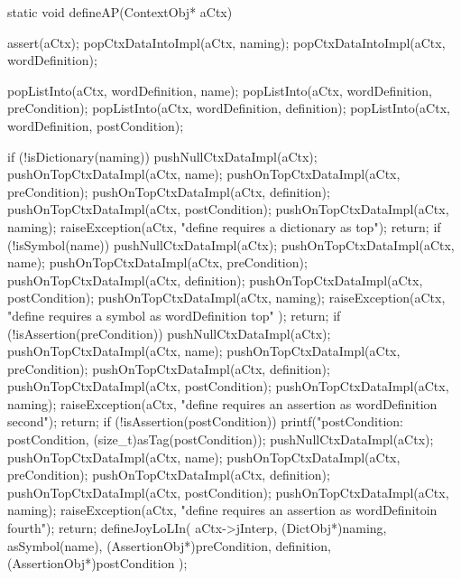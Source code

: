 \startCCode
static void defineAP(ContextObj* aCtx) {
  assert(aCtx);
  popCtxDataIntoImpl(aCtx,    naming);
  popCtxDataIntoImpl(aCtx,    wordDefinition);
  
  popListInto(aCtx, wordDefinition, name);
  popListInto(aCtx, wordDefinition, preCondition);
  popListInto(aCtx, wordDefinition, definition);
  popListInto(aCtx, wordDefinition, postCondition);

  if (!isDictionary(naming)) {
    pushNullCtxDataImpl(aCtx);
    pushOnTopCtxDataImpl(aCtx, name);
    pushOnTopCtxDataImpl(aCtx, preCondition);
    pushOnTopCtxDataImpl(aCtx, definition);
    pushOnTopCtxDataImpl(aCtx, postCondition);
    pushOnTopCtxDataImpl(aCtx, naming);
    raiseException(aCtx,
      "define requires a dictionary as top");
    return;
  }
  if (!isSymbol(name)) {
    pushNullCtxDataImpl(aCtx);
    pushOnTopCtxDataImpl(aCtx, name);
    pushOnTopCtxDataImpl(aCtx, preCondition);
    pushOnTopCtxDataImpl(aCtx, definition);
    pushOnTopCtxDataImpl(aCtx, postCondition);
    pushOnTopCtxDataImpl(aCtx, naming);
    raiseException(aCtx,
      "define requires a symbol as wordDefinition top"
    );
    return;
  }
  if (!isAssertion(preCondition)) {
    pushNullCtxDataImpl(aCtx);
    pushOnTopCtxDataImpl(aCtx, name);
    pushOnTopCtxDataImpl(aCtx, preCondition);
    pushOnTopCtxDataImpl(aCtx, definition);
    pushOnTopCtxDataImpl(aCtx, postCondition);
    pushOnTopCtxDataImpl(aCtx, naming);
    raiseException(aCtx,
      "define requires an assertion as wordDefinition second");
    return;
  }
  if (!isAssertion(postCondition)) {
    printf("postCondition: %
      postCondition, (size_t)asTag(postCondition));
    pushNullCtxDataImpl(aCtx);
    pushOnTopCtxDataImpl(aCtx, name);
    pushOnTopCtxDataImpl(aCtx, preCondition);
    pushOnTopCtxDataImpl(aCtx, definition);
    pushOnTopCtxDataImpl(aCtx, postCondition);
    pushOnTopCtxDataImpl(aCtx, naming);
    raiseException(aCtx,
      "define requires an assertion as wordDefinitoin fourth");
    return;
  }
  defineJoyLoLIn(
    aCtx->jInterp,
    (DictObj*)naming,
    asSymbol(name),
    (AssertionObj*)preCondition,
    definition,
    (AssertionObj*)postCondition
  );
}
\stopCCode

